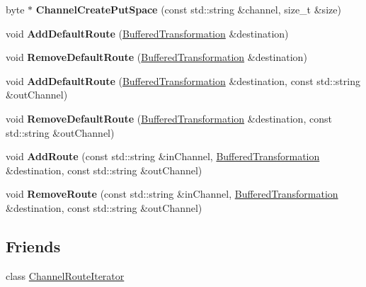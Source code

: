 \begin{DoxyCompactItemize}
\item 
\hypertarget{class_channel_switch_a9c85fb995b21617a9d10ac2909abd633}{
byte $\ast$ {\bfseries ChannelCreatePutSpace} (const std::string \&channel, size\_\-t \&size)}
\label{class_channel_switch_a9c85fb995b21617a9d10ac2909abd633}

\item 
\hypertarget{class_channel_switch_a3392fbeb13569f9861564ed31120088d}{
void {\bfseries AddDefaultRoute} (\hyperlink{class_buffered_transformation}{BufferedTransformation} \&destination)}
\label{class_channel_switch_a3392fbeb13569f9861564ed31120088d}

\item 
\hypertarget{class_channel_switch_a0405fc201e843057cbee150e30eadc4a}{
void {\bfseries RemoveDefaultRoute} (\hyperlink{class_buffered_transformation}{BufferedTransformation} \&destination)}
\label{class_channel_switch_a0405fc201e843057cbee150e30eadc4a}

\item 
\hypertarget{class_channel_switch_abd84e65942431ade1f2e579a009bd400}{
void {\bfseries AddDefaultRoute} (\hyperlink{class_buffered_transformation}{BufferedTransformation} \&destination, const std::string \&outChannel)}
\label{class_channel_switch_abd84e65942431ade1f2e579a009bd400}

\item 
\hypertarget{class_channel_switch_a5cff9d31ff039901331d85ecff0e325d}{
void {\bfseries RemoveDefaultRoute} (\hyperlink{class_buffered_transformation}{BufferedTransformation} \&destination, const std::string \&outChannel)}
\label{class_channel_switch_a5cff9d31ff039901331d85ecff0e325d}

\item 
\hypertarget{class_channel_switch_aadc822b937f15ad9a231ca8a4a66636e}{
void {\bfseries AddRoute} (const std::string \&inChannel, \hyperlink{class_buffered_transformation}{BufferedTransformation} \&destination, const std::string \&outChannel)}
\label{class_channel_switch_aadc822b937f15ad9a231ca8a4a66636e}

\item 
\hypertarget{class_channel_switch_aafbbeaa87847c1a527f1489c6afdcf18}{
void {\bfseries RemoveRoute} (const std::string \&inChannel, \hyperlink{class_buffered_transformation}{BufferedTransformation} \&destination, const std::string \&outChannel)}
\label{class_channel_switch_aafbbeaa87847c1a527f1489c6afdcf18}

\end{DoxyCompactItemize}
\subsection*{Friends}
\begin{DoxyCompactItemize}
\item 
\hypertarget{class_channel_switch_a682648bed9bc0f0f61b687ccfdebbdf7}{
class \hyperlink{class_channel_switch_a682648bed9bc0f0f61b687ccfdebbdf7}{ChannelRouteIterator}}
\label{class_channel_switch_a682648bed9bc0f0f61b687ccfdebbdf7}

\end{DoxyCompactItemize}


